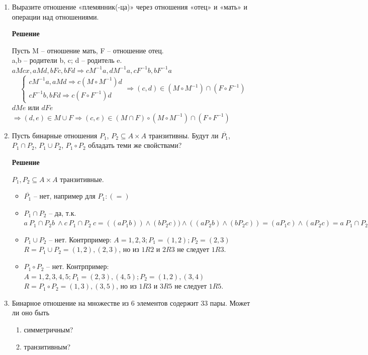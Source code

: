 \documentclass[12pt]{article}
\begin{document}
\begin{enumerate}[label={\textbf{\arabic{section}.\arabic*}}]
		\item Выразите отношение «племянник(-ца)» через отношения «отец» и «мать» и операции над отношениями.
		
		\textbf{Решение}
		
		Пусть M -- отношение мать, F -- отношение отец.\\
		a,b -- родители b, c; d -- родитель e.\\
		$aMcx, aMd, bFc, bFd \Rightarrow cM^{-1}a, dM^{-1}a, cF^{-1}b, bF^{-1}a$\\
		
		\begin{equation*}
			\begin{cases}
				cM^{-1}a, aMd \Rightarrow c(M\circ M^{-1})d\\
				cF^{-1}b, bFd \Rightarrow c(F\circ F^{-1})d
			\end{cases}
			\Rightarrow (c,d) \in (M\circ M^{-1})\cap (F\circ F^{-1})
		\end{equation*}
		$dMe$ или $dFe$ $\Rightarrow (d,e) \in M\cup F \Rightarrow
		(c,e) \in (M \cap F)\circ (M\circ M^{-1})\cap (F\circ F^{-1})$
		
		\item Пусть бинарные отношения $P_1$, $P_2\subseteq A \times A$ транзитивны. Будут ли $\overline{P_1}$, $P_1\cap P_2$, $P_1\cup P_2$, $P_1\circ P_2$ обладать теми же свойствами?

		
		\textbf{Решение}
		
		$P_1, P_2 \subseteq A\times A$ транзитивные.
		\begin{itemize}
			\item $\overline{P_1}$ -- нет, например для $P_1: (=)$
			\item $P_1 \cap P_2$ -- да, т.к. $a\ P_1\cap P_2 b\ \land c\ P_1\cap P_2\ c = ((aP_1b))\land(bP_2c))\land((aP_2b)\land(bP_2c)) = (aP_1c)\land(aP_2c) = a\ P_1\cap P_2\ c$
			\item $P_1 \cup P_2$ -- нет. Контрпример: $A = {1, 2, 3}; P_1 = {(1,2)}; P_2 = {(2, 3)}$\\
			$R = P_1 \cup P_2 = {(1, 2), (2, 3)}$, но из $1R2$ и $2R3$ не следует $1R3$.
			\item $P_1 \circ P_2$ -- нет. Контрпример: $A = {1, 2, 3, 4, 5}; P_1 = {(2, 3), (4,5)}; P_2 = {(1,2),(3,4)}$\\
			$R = P_1 \circ P_2 = {(1, 3), (3, 5)}$, но из $1R3$ и $3R5$ не следует $1R5$.
		\end{itemize}
	
		\item  Бинарное отношение на множестве из 6 элементов содержит $33$ пары. Может ли оно быть
		\begin{enumerate}[label=\textbf{\alph*)}]
			\item симметричным?
			\item транзитивным?
		\end{enumerate}
	

\end{enumerate}
\end{document}
